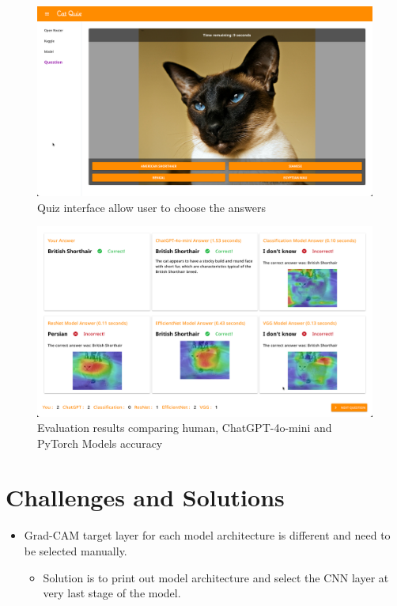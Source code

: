 \documentclass{article}
\begin{document}
\begin{figure}[H]
    \centering
    \includegraphics[width=\textwidth]{quiz.png}
    \caption{Quiz interface allow user to choose the answers}
    \label{fig:quiz}
\end{figure}


\begin{figure}[H]
    \centering
    \includegraphics[width=\textwidth]{evaluation.png}
    \caption{Evaluation results comparing human, ChatGPT-4o-mini and PyTorch Models accuracy}
    \label{fig:evaluation}
\end{figure}

\section{Challenges and Solutions}
\begin{itemize}
    \item Grad-CAM target layer for each model architecture is different and need to be selected manually.
    \begin{itemize}
        \item Solution is to print out model architecture and select the CNN layer at very last stage of the model.
    \end{itemize} 
\end{itemize}
\end{document}
